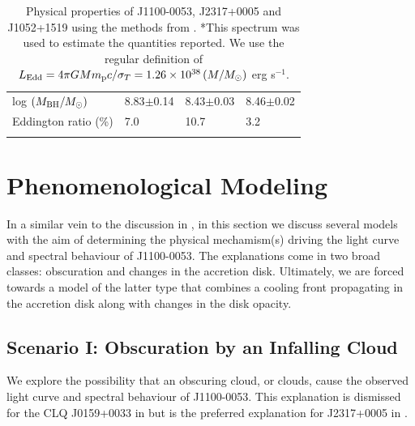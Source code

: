 \documentclass[a4paper,fleqn,usenatbib]{mnras}
\begin{document}
\begin{table}
\begin{tabular}{l l l l}
    log $(M_{\rm BH} / M_{\odot})  $           &  8.83$\pm$0.14                & 8.43$\pm$0.03           & 8.46$\pm$0.02 \\
    Eddington ratio  (\%)                        &        7.0                         &  10.7                           &  3.2     \\ 
    &&\\
    \hline \hline 
  \end{tabular}
  \caption{Physical properties of J1100-0053, J2317+0005 and J1052+1519 using the
    methods from \citet{Shen2011}. *This spectrum was used to estimate
    the quantities reported.  We use the regular definition of $L_{\rm
      Edd} = 4 \pi G M m_{\rm p} c /\sigma_{T} =
    1.26\times10^{38}\left (M/M_{\odot} \right )$ erg s$^{-1}$.} 
 \label{tab:Shen_props}
\end{table}



\section{Phenomenological Modeling} 
In a similar vein to the discussion in \cite{Stern2018}, in this
section we discuss several models with the aim of determining the
physical mechamism(s) driving the light curve and spectral behaviour
of J1100-0053. The explanations come in two broad classes: obscuration
and changes in the accretion disk. Ultimately, we are forced towards
a model of the latter type that combines a cooling front propagating
in the accretion disk along with changes in the disk opacity.

\subsection{Scenario I: Obscuration by an Infalling Cloud}
We explore the possibility that an obscuring cloud, or clouds, cause
the observed light curve and spectral behaviour of J1100-0053. This
explanation is dismissed for the CLQ J0159+0033 in \citet{LaMassa2015}
but is the preferred explanation for J2317+0005 in \citet{Guo2016}.
\end{document}
